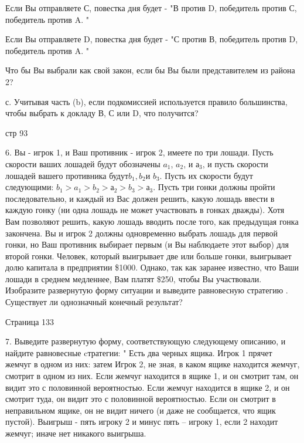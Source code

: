 \documentclass[a4paper,12pt]{article}
\begin{document}
Если Вы отправляете С, повестка дня будет - "В
против D, победитель против С, победитель против A.
"

Если Вы отправляете D, повестка дня будет - "С
против В, победитель против D, победитель против A.
"

Что бы Вы выбрали как свой закон, если бы Вы были
представителем из района 2?

с. Учитывая часть (b), если подкомиссией
используется правило большинства, чтобы выбрать к
докладу В, С или D, что получится?

стр 93

6. Вы - игрок 1, и Ваш противник - игрок 2, имеете
по три лошади. Пусть скорости ваших лошадей будут
обозначены $a_{1}$, $a_{2}$, и $а _{3}$, и пусть
скорости лошадей вашего противника
будут$b_{1},b_{2}$и $b_{3}$. Пусть их скорости
будут следующими: $b_{1}>a_{1}>b_{2}>а _{2}>b_{3}>а
_{3}$. Пусть три гонки должны пройти
последовательно, и каждый из Вас должен решить,
какую лошадь ввести в каждую гонку (ни одна лошадь
не может участвовать в гонках дважды). Хотя Вам
позволяют решить, какую лошадь вводить после того,
как предыдущая гонка закончена. Вы и игрок 2 должны
одновременно выбрать лошадь для первой гонки, но
Ваш противник выбирает первым (и Вы наблюдаете этот
выбор) для второй гонки. Человек, который
выигрывает две или больше гонки, выигрывает долю
капитала в предприятии \$1000. Однако, так как
заранее известно, что Ваши лошади в среднем
медленнее, Вам платят \$250, чтобы Вы участвовали.
Изобразите развернутую форму ситуации и выведите
равновесную стратегию . Существует ли однозначный
конечный результат?

\bigskip

Страница 133

7. Выведите развернутую форму, соответствующую
следующему описанию, и найдите равновесные
cтратегии: " Есть два черных ящика. Игрок 1 прячет
жемчуг в одном из них: затем Игрок 2, не зная, в
каком ящике находится жемчуг, смотрит в одном из
них. Если жемчуг находится в ящике 1, и он смотрит
там, он видит это с половинной вероятностью. Если
жемчуг находится в ящике 2, и он смотрит туда, он
видит это с половинной вероятностью. Если он
смотрит в неправильном ящике, он не видит ничего (и
даже не сообщается, что ящик пустой). Выигрыш -
пять игроку 2 и минус пять -- игроку 1, если 2
находит жемчуг; иначе нет никакого выигрыша.
\end{document}
